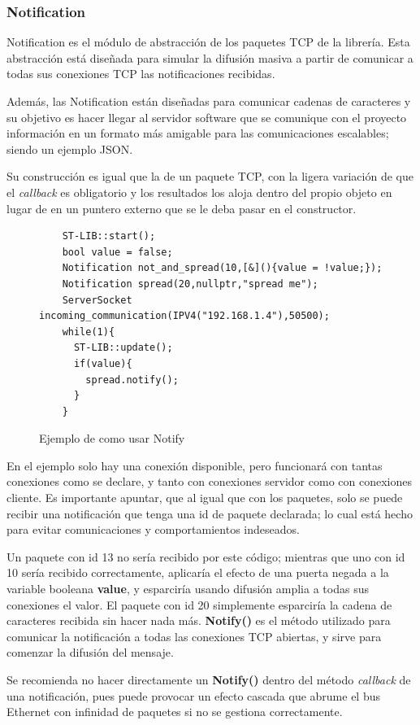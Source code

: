 \documentclass{report}
\begin{document}
\subsubsection{Notification}
Notification es el módulo de abstracción de los paquetes TCP de la librería. Esta abstracción está diseñada para simular la difusión masiva a partir de comunicar a todas sus conexiones TCP las notificaciones recibidas. \par
Además, las Notification están diseñadas para comunicar cadenas de caracteres y su objetivo es hacer llegar al servidor software que se comunique con el proyecto información en un formato más amigable para las comunicaciones escalables; siendo un ejemplo JSON.
 \par \vspace{0.3cm}
Su construcción es igual que la de un paquete TCP, con la ligera variación de que el \textit{callback} es obligatorio y los resultados los aloja dentro del propio objeto en lugar de en un puntero externo que se le deba pasar en el constructor. 
\begin{figure}[h]
  \begin{lstlisting}
    ST-LIB::start();
    bool value = false;
    Notification not_and_spread(10,[&](){value = !value;});
    Notification spread(20,nullptr,"spread me");
    ServerSocket incoming_communication(IPV4("192.168.1.4"),50500);
    while(1){
      ST-LIB::update();
      if(value){
        spread.notify();
      }
    }
  \end{lstlisting}
  \caption{Ejemplo de como usar Notify}
  \label{NotifyCode}
\end{figure}
\par \vspace{0.3cm}
En el ejemplo solo hay una conexión disponible, pero funcionará con tantas conexiones como se declare, y tanto con conexiones servidor como con conexiones cliente. Es importante apuntar, que al igual que con los paquetes, solo se puede recibir una notificación que tenga una id de paquete declarada; lo cual está hecho para evitar comunicaciones y comportamientos indeseados. \par 
Un paquete con id 13 no sería recibido por este código; mientras que uno con id 10 sería recibido correctamente, aplicaría el efecto de una puerta negada a la variable booleana \textbf{value}, y esparciría usando difusión amplia a todas sus conexiones el valor. El paquete con id 20 simplemente esparciría la cadena de caracteres recibida sin hacer nada más. \textbf{Notify()} es el método utilizado para comunicar la notificación a todas las conexiones TCP abiertas, y sirve para comenzar la difusión del mensaje. \par \vspace{0.3cm}
Se recomienda no hacer directamente un \textbf{Notify()} dentro del método \textit{callback} de una notificación, pues puede provocar un efecto cascada que abrume el bus Ethernet con infinidad de paquetes si no se gestiona correctamente.  
\end{document}
